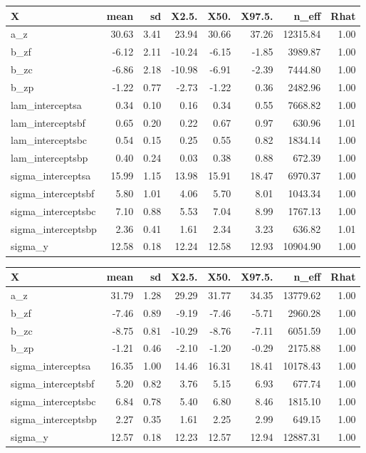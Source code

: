 \documentclass[11pt]{article}
\begin{document}
\clearpage



\begingroup\footnotesize
\begin{tabular}{lrrrrrrr}
  \hline
X & mean & sd & X2.5. & X50. & X97.5. & n\_eff & Rhat \\ 
  \hline
a\_z & 30.63 & 3.41 & 23.94 & 30.66 & 37.26 & 12315.84 & 1.00 \\ 
  b\_zf & -6.12 & 2.11 & -10.24 & -6.15 & -1.85 & 3989.87 & 1.00 \\ 
  b\_zc & -6.86 & 2.18 & -10.98 & -6.91 & -2.39 & 7444.80 & 1.00 \\ 
  b\_zp & -1.22 & 0.77 & -2.73 & -1.22 & 0.36 & 2482.96 & 1.00 \\ 
  lam\_interceptsa & 0.34 & 0.10 & 0.16 & 0.34 & 0.55 & 7668.82 & 1.00 \\ 
  lam\_interceptsbf & 0.65 & 0.20 & 0.22 & 0.67 & 0.97 & 630.96 & 1.01 \\ 
  lam\_interceptsbc & 0.54 & 0.15 & 0.25 & 0.55 & 0.82 & 1834.14 & 1.00 \\ 
  lam\_interceptsbp & 0.40 & 0.24 & 0.03 & 0.38 & 0.88 & 672.39 & 1.00 \\ 
  sigma\_interceptsa & 15.99 & 1.15 & 13.98 & 15.91 & 18.47 & 6970.37 & 1.00 \\ 
  sigma\_interceptsbf & 5.80 & 1.01 & 4.06 & 5.70 & 8.01 & 1043.34 & 1.00 \\ 
  sigma\_interceptsbc & 7.10 & 0.88 & 5.53 & 7.04 & 8.99 & 1767.13 & 1.00 \\ 
  sigma\_interceptsbp & 2.36 & 0.41 & 1.61 & 2.34 & 3.23 & 636.82 & 1.01 \\ 
  sigma\_y & 12.58 & 0.18 & 12.24 & 12.58 & 12.93 & 10904.90 & 1.00 \\ 
  \end{tabular}
\endgroup \clearpage \pagebreak 
\begingroup\footnotesize
\begin{tabular}{lrrrrrrr}
  \hline
X & mean & sd & X2.5. & X50. & X97.5. & n\_eff & Rhat \\ 
  \hline
a\_z & 31.79 & 1.28 & 29.29 & 31.77 & 34.35 & 13779.62 & 1.00 \\ 
  b\_zf & -7.46 & 0.89 & -9.19 & -7.46 & -5.71 & 2960.28 & 1.00 \\ 
  b\_zc & -8.75 & 0.81 & -10.29 & -8.76 & -7.11 & 6051.59 & 1.00 \\ 
  b\_zp & -1.21 & 0.46 & -2.10 & -1.20 & -0.29 & 2175.88 & 1.00 \\ 
  sigma\_interceptsa & 16.35 & 1.00 & 14.46 & 16.31 & 18.41 & 10178.43 & 1.00 \\ 
  sigma\_interceptsbf & 5.20 & 0.82 & 3.76 & 5.15 & 6.93 & 677.74 & 1.00 \\ 
  sigma\_interceptsbc & 6.84 & 0.78 & 5.40 & 6.80 & 8.46 & 1815.10 & 1.00 \\ 
  sigma\_interceptsbp & 2.27 & 0.35 & 1.61 & 2.25 & 2.99 & 649.15 & 1.00 \\ 
  sigma\_y & 12.57 & 0.18 & 12.23 & 12.57 & 12.94 & 12887.31 & 1.00 \\ 
  \end{tabular}
\endgroup \clearpage \pagebreak 
\end{document}
